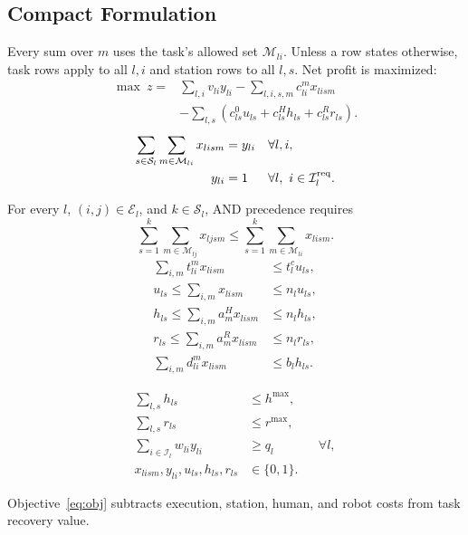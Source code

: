 \subsection{Compact Formulation}
Every sum over $m$ uses the task's allowed set $\mathcal M_{li}$. Unless a row states otherwise, task rows apply to all $l,i$ and station rows to all $l,s$. Net profit is maximized:
\begin{align}
\max\ z={}&\sum_{l,i}v_{li}y_{li}-\sum_{l,i,s,m}c_{li}^{m}x_{lism}\nonumber\\
&-\sum_{l,s}\left(c_{ls}^{0}u_{ls}+c_{ls}^{H}h_{ls}+c_{ls}^{R}r_{ls}\right).\label{eq:obj}
\end{align}
\begin{align}
\sum_{s\in\mathcal S_l}\sum_{m\in\mathcal M_{li}}x_{lism}&=y_{li}&&\forall l,i,\label{eq:assign}\\
y_{li}&=1&&\forall l,\ i\in\mathcal I_l^{\rm req}.\label{eq:required}
\end{align}

For every $l$, $(i,j)\in\mathcal E_l$, and $k\in\mathcal S_l$, AND precedence requires
\begin{equation}
\sum_{s=1}^{k}\sum_{m\in\mathcal M_{lj}}x_{ljsm}
\leq\sum_{s=1}^{k}\sum_{m\in\mathcal M_{li}}x_{lism}.\label{eq:prec}
\end{equation}
\begin{align}
\sum_{i,m}t_{li}^{m}x_{lism}&\leq t_l^c u_{ls},\label{eq:cycle}\\
u_{ls}\leq\sum_{i,m}x_{lism}&\leq n_lu_{ls},\label{eq:active}\\
h_{ls}\leq\sum_{i,m}a_m^Hx_{lism}&\leq n_lh_{ls},\label{eq:hlogic}\\
r_{ls}\leq\sum_{i,m}a_m^Rx_{lism}&\leq n_lr_{ls},\label{eq:rlogic}\\
\sum_{i,m}d_{li}^{m}x_{lism}&\leq b_lh_{ls}.\label{eq:fatigue}
\end{align}

\begin{align}
\sum_{l,s}h_{ls}&\leq h^{\max},\label{eq:sharedh}\\
\sum_{l,s}r_{ls}&\leq r^{\max},\label{eq:sharedr}\\
\sum_{i\in\mathcal I_l}w_{li}y_{li}&\geq q_l&&\forall l,\label{eq:recovery}\\
x_{lism},y_{li},u_{ls},h_{ls},r_{ls}&\in\{0,1\}.\label{eq:binary}
\end{align}

Objective~\eqref{eq:obj} subtracts execution, station, human, and robot costs from task recovery value.


